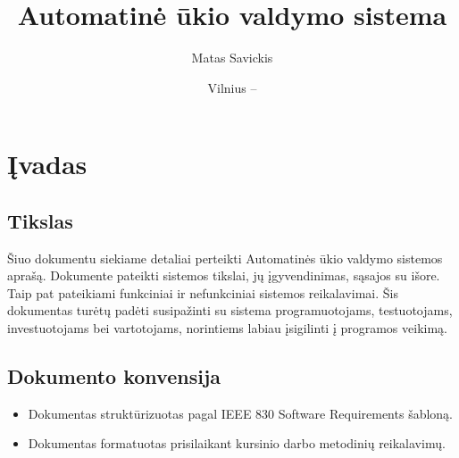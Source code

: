 \documentclass[oneside]{VUMIFPSkursinis}
\title{Automatinė ūkio valdymo sistema}
\author{Matas Savickis}
\date{Vilnius – \the\year}
\begin{document}
\maketitle


\centering

 
\tableofcontents


\section{Įvadas}
\subsection{Tikslas}
Šiuo dokumentu siekiame detaliai perteikti Automatinės ūkio valdymo sistemos aprašą. Dokumente pateikti sistemos tikslai, jų įgyvendinimas, sąsajos su išore. Taip pat pateikiami funkciniai ir nefunkciniai sistemos reikalavimai. Šis dokumentas turėtų padėti susipažinti su sistema programuotojams, testuotojams, investuotojams bei vartotojams, norintiems labiau įsigilinti į programos veikimą.
\subsection{Dokumento konvensija}
\begin{itemize}
	\item Dokumentas struktūrizuotas pagal IEEE 830 Software Requirements šabloną.
	\item Dokumentas formatuotas prisilaikant kursinio darbo metodinių reikalavimų.
\end{itemize}
\end{document}
